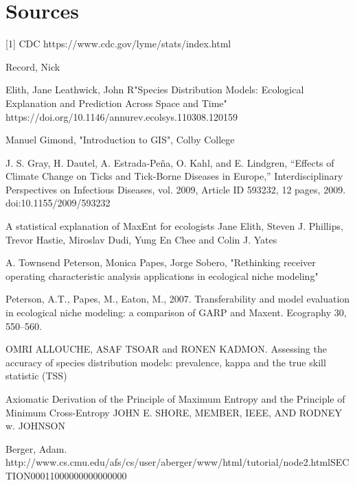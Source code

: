 
\chapter{Sources} %
[1] CDC https://www.cdc.gov/lyme/stats/index.html \newline

\noindent [2] Record, Nick \newline

\noindent [3] Elith, Jane Leathwick, John R"Species Distribution Models: Ecological Explanation and Prediction Across Space and Time" https://doi.org/10.1146/annurev.ecolsys.110308.120159\newline

\noindent [4] Manuel Gimond, "Introduction to GIS", Colby College \newline

\noindent [5] J. S. Gray, H. Dautel, A. Estrada-Peña, O. Kahl, and E. Lindgren, “Effects of Climate Change on Ticks and Tick-Borne Diseases in Europe,” Interdisciplinary Perspectives on Infectious Diseases, vol. 2009, Article ID 593232, 12 pages, 2009. doi:10.1155/2009/593232\newline

\noindent [6] A statistical explanation of MaxEnt for ecologists Jane Elith, Steven J. Phillips, Trevor Hastie, Miroslav Dudi, Yung En Chee and Colin J. Yates\newline

\noindent [7] A. Townsend Peterson, Monica Papes, Jorge Sobero, "Rethinking receiver operating characteristic analysis applications in ecological niche modeling" \newline

\noindent [8] Peterson, A.T., Papes, M., Eaton, M., 2007. Transferability and model evaluation in ecological niche modeling: a comparison of GARP and Maxent. Ecography 30, 550–560. \newline

\noindent [9] OMRI ALLOUCHE, ASAF TSOAR and RONEN KADMON. Assessing the accuracy of species distribution models: prevalence, kappa and the true skill statistic (TSS) \newline

\noindent [10]  Axiomatic Derivation of the Principle of Maximum Entropy and the Principle of Minimum Cross-Entropy JOHN E. SHORE, MEMBER, IEEE, AND RODNEY w. JOHNSON \newline

\noindent [11] Berger, Adam. http://www.cs.cmu.edu/afs/cs/user/aberger/www/html/tutorial/node2.htmlSECTION00011000000000000000 \newline

